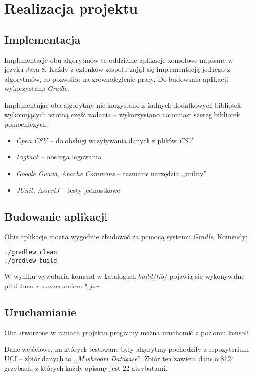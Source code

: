 \section{Realizacja projektu}

\subsection{Implementacja}

Implementacje obu algorytmów to oddzielne aplikacje konsolowe napisane w języku Java 8. Każdy z członków zespołu zajął się implementacją jednego z algorytmów, co pozwoliło na zrównoleglenie pracy. Do budowania aplikacji wykorzystano \emph{Gradle}.

Implementując oba algorytmy nie korzystano z żadnych dodatkowych bibliotek wykonujących istotną część zadania -- wykorzystano natomiast szereg bibliotek pomocniczych:

\begin{itemize}
	\item \emph{Open CSV} -- do obsługi wczytywania danych z plików \emph{CSV}
	\item \emph{Logback} -- obsługa logowania
	\item \emph{Google Guava}, \emph{Apache Commons} -- rozmaite narzędzia ,,utility''
	\item \emph{JUnit}, \emph{AssertJ} -- testy jednostkowe
\end{itemize}

\subsection{Budowanie aplikacji}

Obie aplikacje można wygodnie zbudować za pomocą systemu \emph{Gradle}. Komendy:
\begin{lstlisting}
./gradlew clean
./gradlew build
\end{lstlisting}

W wyniku wywołania komend w katalogach $build/lib/$ pojawią się wykonywalne pliki Java z rozszerzeniem $*.jar$.

\subsection{Uruchamianie}


Oba stworzone w ramach projektu programy można uruchomić z poziomu konsoli.

Dane wejściowe, na których testowane były algorytmy pochodziły z repozytorium UCI \cite{UCI} -- zbiór danych to ,,\emph{Mushroom Database}''. Zbiór ten zawiera dane o 8124 grzybach, z których każdy opisany jest 22 atrybutami.

